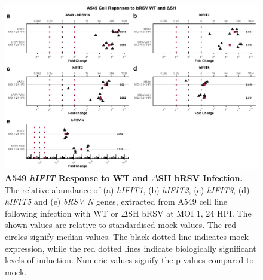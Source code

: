 \begin{figure}
    \centering
    \includegraphics[width=1\linewidth]{06. Chapter 1/Figs/01. Induction/07. a549_brsv_moi1.pdf}
    \caption[A549 \textit{hIFIT} Response to WT and \(\Delta\)SH bRSV Infection.]{\textbf{A549 \textit{hIFIT} Response to WT and \(\Delta\)SH bRSV Infection.} The relative abundance of (a) \textit{hIFIT1}, (b) \textit{hIFIT2}, (c) \textit{hIFIT3}, (d) \textit{hIFIT5} and (e) \textit{bRSV N} genes, extracted from A549 cell line following infection with WT or \(\Delta\)SH bRSV at MOI 1, 24 HPI.  The shown values are relative to standardised mock values. The red circles signify median values. The black dotted line indicates mock expression, while the red dotted lines indicate biologically significant levels of induction. Numeric values signify the p-values compared to mock.}
    \label{fig:Responses of A549 to bRSV WT and dSH.}
\end{figure}

